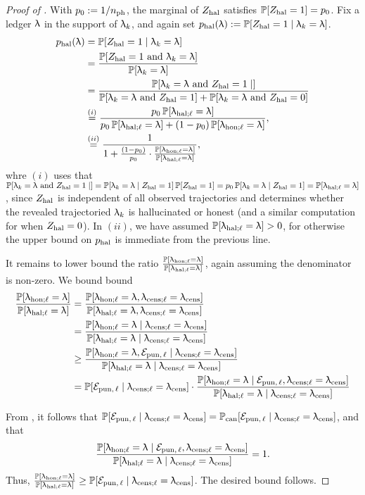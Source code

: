 \begin{proof}[Proof of ] With $p_0 := 1/\nphase$, the marginal of $\Zhal$ satisfies $\Pr[\Zhal = 1] = p_0$. Fix a ledger $\ledger$ in the support of $\ledger_k$, and again set $\phal(\ledger) := \Pr[\Zhal = 1\mid \ledger_k = \ledger]$.
\begin{align}
\phal(\ledger) &= \Pr[\Zhal = 1 \mid  \ledger_k = \ledger ]\\
&= \frac{\Pr[\Zhal = 1 \text{ and }  \ledger_k = \ledger ]}{\Pr[\ledger_k = \ledger]} \nonumber\\
&= \frac{\Pr[\ledger_k  = \ledger \text{ and } \Zhal = 1 \mid  ]}{\Pr[\ledger_k = \ledger \text{ and } \Zhal = 1] + \Pr[\ledger_k = \ledger \text{ and } \Zhal = 0 ] } \nonumber\\
&\overset{(i)}{=} \frac{p_0\Pr[\ledhall = \ledger] }{p_0\Pr[\ledhall = \ledger] + (1-p_0)\Pr[\ledhonl = \ledger] }, \nonumber\\
&\overset{(ii)}{=} \frac{1 }{1 + \frac{(1-p_0)}{p_0}\cdot \frac{\Pr[\ledhonl = \ledger]}{\Pr[\ledhall = \ledger]} }, \label{eq:phal_first_bound}
\end{align}
whre $(i)$ uses that $\Pr[\ledger_k  = \ledger \text{ and } \Zhal = 1 \mid  ] = \Pr[\ledger_k  = \ledger \mid \Zhal = 1 ] \Pr[\Zhal = 1] = p_0 \Pr[\ledger_k  = \ledger \mid \Zhal = 1 ] = \Pr[\ledhall = \ledger]$, since $\Zhal$ is independent of all observed trajectories and determines whether the revealed trajectoried $\ledger_k$ is hallucinated or honest (and a similar computation for when $\Zhal = 0$). In $(ii)$, we have assumed $\Pr[\ledhall = \ledger]  > 0$, for otherwise the upper bound on $\phal$ is immediate from the previous line.


It remains to lower bound the ratio $\frac{\Pr[\ledhonl = \ledger]}{\Pr[\ledhall = \ledger]}$, again assuming the denominator is non-zero.
We bound bound
\begin{align*}
\frac{\Pr[\ledhonl = \ledger]}{\Pr[\ledhall = \ledger]} &= \frac{\Pr[\ledhonl = \ledger, \ledcensl = \ledcs]}{\Pr[\ledhall = \ledger, \ledcensl = \ledcs]}\\
&= \frac{\Pr[\ledhonl = \ledger \mid \ledcensl = \ledcs]}{\Pr[\ledhall = \ledger \mid \ledcensl = \ledcs]}\\
&\ge \frac{\Pr[\ledhonl = \ledger, \EvPun \mid \ledcensl = \ledcs]}{\Pr[\ledhall = \ledger \mid \ledcensl = \ledcs]}\\
&= \Pr[  \EvPun \mid \ledcensl = \ledcs] \cdot  \frac{\Pr[\ledhonl = \ledger \mid \EvPun, \ledcensl = \ledcs]}{\Pr[\ledhall = \ledger \mid \ledcensl = \ledcs]}
\end{align*}

 From , it follows that $\Pr[  \EvPun \mid \ledcensl = \ledcs]  = \Prcan[ \EvPun \mid \ledcensl = \ledcs]$, and that
\begin{align*}
\frac{\Pr[\ledhonl = \ledger \mid \EvPun, \ledcensl = \ledcs]}{\Pr[\ledhall = \ledger \mid \ledcensl = \ledcs]} = 1.
\end{align*}
Thus, $\frac{\Pr[\ledhonl = \ledger]}{\Pr[\ledhall = \ledger]} \ge \Pr[ \EvPun \mid \ledcensl = \ledcs]$. The desired bound follows.
\end{proof}
